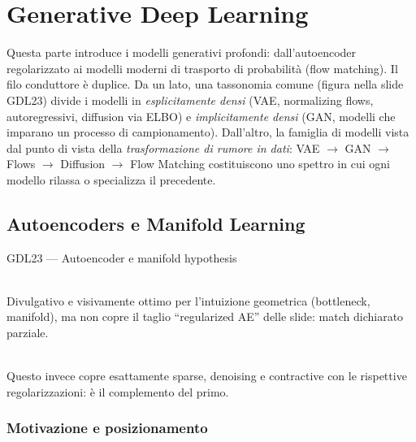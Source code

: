 \part{Generative Deep Learning}
\label{part:generative}

Questa parte introduce i modelli generativi profondi: dall'autoencoder regolarizzato ai modelli moderni di trasporto di probabilità (flow matching). Il filo conduttore è duplice. Da un lato, una tassonomia comune (figura nella slide GDL23) divide i modelli in \emph{esplicitamente densi} (VAE, normalizing flows, autoregressivi, diffusion via ELBO) e \emph{implicitamente densi} (GAN, modelli che imparano un processo di campionamento). Dall'altro, la famiglia di modelli vista dal punto di vista della \emph{trasformazione di rumore in dati}: VAE $\to$ GAN $\to$ Flows $\to$ Diffusion $\to$ Flow Matching costituiscono uno spettro in cui ogni modello rilassa o specializza il precedente.

\chapter{Autoencoders e Manifold Learning}
\label{ch:ae}

\begin{risorsevideo}{GDL23 — Autoencoder e manifold hypothesis}

\medskip
{}\\
Divulgativo e visivamente ottimo per l'intuizione geometrica (bottleneck, manifold), ma non copre il taglio ``regularized AE'' delle slide: match dichiarato parziale.

\medskip
{}\\
Questo invece copre esattamente sparse, denoising e contractive con le rispettive regolarizzazioni: è il complemento del primo.
\end{risorsevideo}

\section{Motivazione e posizionamento}

